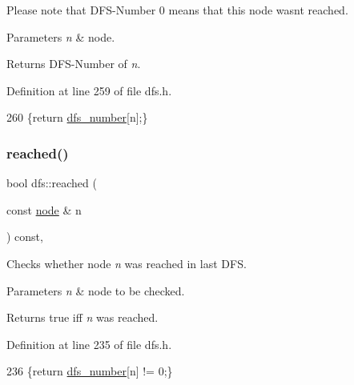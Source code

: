Please note that D\+F\+S-\/\+Number 0 means that this node wasn\textquotesingle{}t reached.


\begin{DoxyParams}{Parameters}
{\em n} & node. \\
\hline
\end{DoxyParams}
\begin{DoxyReturn}{Returns}
D\+F\+S-\/\+Number of {\itshape n}. 
\end{DoxyReturn}


Definition at line 259 of file dfs.\+h.


\begin{DoxyCode}
260     \{\textcolor{keywordflow}{return} \mbox{\hyperlink{classdfs_a99727f2274d6af63daae4f0518f3adbe}{dfs\_number}}[n];\}
\end{DoxyCode}
\mbox{\label{classdfs_a2948061eb1ea02f57614f9044c8e63cf}} 
\subsubsection{\texorpdfstring{reached()}{reached()}}
{\footnotesize\ttfamily bool dfs\+::reached (\begin{DoxyParamCaption}\item[{const \mbox{\hyperlink{classnode}{node}} \&}]{n }\end{DoxyParamCaption}) const\hspace{0.3cm}{\ttfamily [inline]}, {\ttfamily [inherited]}}



Checks whether node {\itshape n} was reached in last D\+FS. 


\begin{DoxyParams}{Parameters}
{\em n} & node to be checked. \\
\hline
\end{DoxyParams}
\begin{DoxyReturn}{Returns}
true iff {\itshape n} was reached. 
\end{DoxyReturn}


Definition at line 235 of file dfs.\+h.


\begin{DoxyCode}
236     \{\textcolor{keywordflow}{return} \mbox{\hyperlink{classdfs_a99727f2274d6af63daae4f0518f3adbe}{dfs\_number}}[n] != 0;\}
\end{DoxyCode}
\mbox{\label{classcomponents_a07b6bab5962524ae26ccb478b35cd76c}} 
